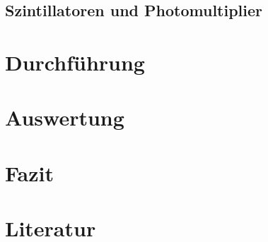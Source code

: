 \documentclass[12pt,a4paper]{scrartcl}
\numberwithin{equation}{section} %
\renewcommand{\[}{} %
\renewcommand{\]}{\noindent} %
\begin{document}
\hypertarget{szintillatoren-und-photomultiplier}{%
\subsection{Szintillatoren und Photomultiplier}\label{szintillatoren-und-photomultiplier}}

\clearpage
\hypertarget{durchfuxfchrung}{%
\section{Durchführung}\label{durchfuxfchrung}}

\clearpage
\hypertarget{auswertung}{%
\section{Auswertung}\label{auswertung}}

\clearpage
\hypertarget{fazit}{%
\section{Fazit}\label{fazit}}

\clearpage
\hypertarget{literatur}{%
\section{Literatur}\label{literatur}}
\end{document}
